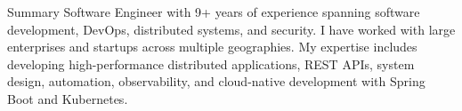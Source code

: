 \begin{rSection}{Summary}
    Software Engineer with 9+ years of experience spanning software development, DevOps, distributed systems, and security. I have worked with large enterprises and startups across multiple geographies. My expertise includes developing high-performance distributed applications, REST APIs, system design, automation, observability, and cloud-native development with Spring Boot and Kubernetes.
\end{rSection}